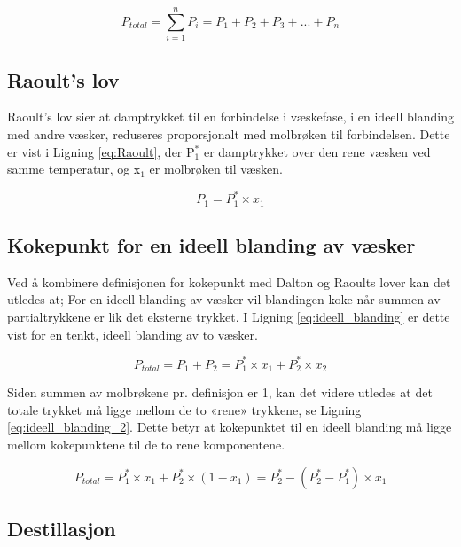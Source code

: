 \begin{equation}\label{eq:dalton}
    P_{total}= \sum_{i=1}^{n} P_i = P_1 + P_2 + P_3 + ... + P_n 
\end{equation}

\subsection{Raoult's lov}

Raoult’s lov sier at damptrykket til en forbindelse i væskefase, i en ideell blanding med andre væsker, reduseres proporsjonalt med molbrøken til forbindelsen.\cite{harwood1999experimental} Dette er vist i Ligning \ref{eq:Raoult}, der P$_1^*$ er damptrykket over den rene væsken ved samme temperatur, og x$_1$ er molbrøken til væsken.

\begin{equation}\label{eq:Raoult}
    P_1 = P_1^* \times x_1
\end{equation}

\subsection{Kokepunkt for en ideell blanding av væsker}

Ved å kombinere definisjonen for kokepunkt med Dalton og Raoults lover kan det utledes at; For en ideell blanding av væsker vil blandingen koke når summen av partialtrykkene er lik det eksterne trykket. I Ligning \ref{eq:ideell_blanding} er dette vist for en tenkt, ideell blanding av to væsker.

\begin{equation}\label{eq:ideell_blanding}
    P_{total}=P_1 + P_2 = P_1^*\times x_1 + P_2^* \times x_2
\end{equation}

Siden summen av molbrøkene pr. definisjon er 1, kan det videre utledes at det totale trykket må ligge mellom de to «rene» trykkene, se Ligning \ref{eq:ideell_blanding_2}. Dette betyr at kokepunktet til en ideell blanding må ligge mellom kokepunktene til de to rene komponentene. 

\begin{equation}\label{eq:ideell_blanding_2}
    P_{total}=P_1^* \times x_1 + P_2^*  \times (1-x_1 ) = P_2^* - (P_2^* - P_1^* ) \times x_1
\end{equation}

\subsection{Destillasjon}

